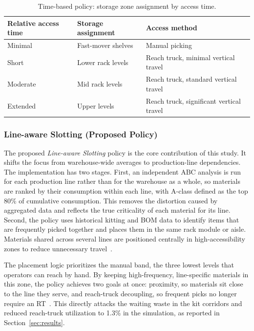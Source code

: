 \documentclass[12pt,a4paper]{article}
\newcommand{\policy}[1]{\textit{#1}}
\begin{document}
\begin{table}[htbp]
\centering
\caption{Time-based policy: storage zone assignment by access time.}
\label{tab:timebased}
\begin{tabular}{lll}
\toprule
Relative access time & Storage assignment & Access method \\
\midrule
Minimal  & Fast-mover shelves & Manual picking \\
Short    & Lower rack levels  & Reach truck, minimal vertical travel \\
Moderate & Mid rack levels    & Reach truck, standard vertical travel \\
Extended & Upper levels       & Reach truck, significant vertical travel \\
\bottomrule
\end{tabular}
\end{table}

\subsubsection{Line-aware Slotting (Proposed Policy)}
The proposed \policy{Line-aware Slotting} policy is the core contribution of
this study. It shifts the focus from warehouse-wide averages to
production-line dependencies. The implementation has two stages. First, an
independent ABC analysis is run for each production line rather than for the
warehouse as a whole, so materials are ranked by their consumption within each
line, with A-class defined as the top 80\% of cumulative consumption. This
removes the distortion caused by aggregated data and reflects the true
criticality of each material for its line. Second, the policy uses historical
kitting and BOM data to identify items that are frequently picked together and
places them in the same rack module or aisle. Materials shared across several
lines are positioned centrally in high-accessibility zones to reduce
unnecessary travel~\cite{hanson2012,limere2012}.

The placement logic prioritizes the manual band, the three lowest levels that
operators can reach by hand. By keeping high-frequency, line-specific
materials in this zone, the policy achieves two goals at once: proximity, so
materials sit close to the line they serve, and reach-truck decoupling, so
frequent picks no longer require an RT~\cite{dekoster2007}. This directly
attacks the waiting waste in the kit corridors and reduced reach-truck
utilization to 1.3\% in the simulation, as reported in Section~\ref{sec:results}.
\end{document}
